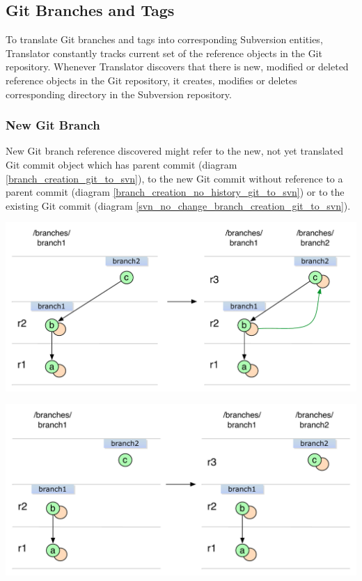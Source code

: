 \subsection{Git Branches and Tags}

To translate Git branches and tags into corresponding Subversion entities, Translator
constantly tracks current set of the reference objects in the Git repository. Whenever
Translator discovers that there is new, modified or deleted reference objects in the Git 
repository, it creates, modifies or deletes corresponding directory in the Subversion repository.
\subsubsection{New Git Branch}

New Git branch reference discovered might refer to the new, not yet translated Git commit object
which has parent commit (diagram \ref{branch_creation_git_to_svn}), to the new Git commit without
reference to a parent commit (diagram \ref{branch_creation_no_history_git_to_svn}) or to the 
existing Git commit (diagram \ref{svn_no_change_branch_creation_git_to_svn}).

\begin{center}
\includegraphics[width=\textwidth]{img/diagrams/branch_creation_git_to_svn.pdf}%
\label{branch_creation_git_to_svn}%
\end{center}

\begin{center}
\includegraphics[width=\textwidth]{img/diagrams/branch_creation_no_history_git_to_svn.pdf}%
\label{branch_creation_no_history_git_to_svn}%
\end{center}

